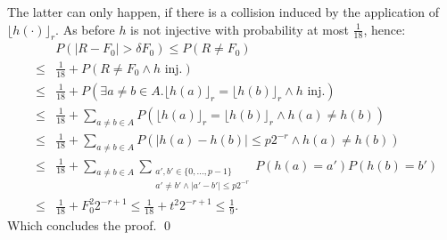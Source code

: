 \documentclass[11pt,a4paper]{article}
\newcommand{\size}[1]{\lvert#1\rvert}
\begin{document}
The latter can only happen, if there is a collision induced by the application of $\lfloor h(\cdot)\rfloor_r$. As before $h$ is not injective with probability at most $\frac{1}{18}$, hence:
\begin{eqnarray*}
    & & P\left( \size{R - F_0} > \delta F_0\right) \leq P\left( R \neq F_0 \right) \\
    & \leq & \frac{1}{18} + P\left( R \neq F_0 \wedge h \textrm{ inj.} \right) \\
    & \leq & \frac{1}{18} + P\left( \exists a \neq b \in A. \lfloor h(a) \rfloor_r = \lfloor h(b) \rfloor_r \wedge h \textrm{ inj.} \right) \\
    & \leq & \frac{1}{18} + \sum_{a \neq b \in A} P\left(\lfloor h(a) \rfloor_r = \lfloor h(b) \rfloor_r \wedge h(a) \neq h(b) \right) \\
    & \leq & \frac{1}{18} + \sum_{a \neq b \in A} P\left(\size{h(a) - h(b)} \leq p 2^{-r} \wedge h(a) \neq h(b) \right) \\
    & \leq & \frac{1}{18} + \sum_{a \neq b \in A} \sum_{\substack{a', b' \in \{0,\ldots, p-1\} \\  a' \neq b' \wedge \size{a'-b'} \leq p 2^{-r}}} P(h(a) = a') P(h(b)= b') \\
    & \leq & \frac{1}{18} + F_0^2 2^{-r+1} \leq \frac{1}{18} + t^2 2^{-r+1} \leq \frac{1}{9} \textrm{.}
\end{eqnarray*}
Which concludes the proof. \qed



\end{document}
